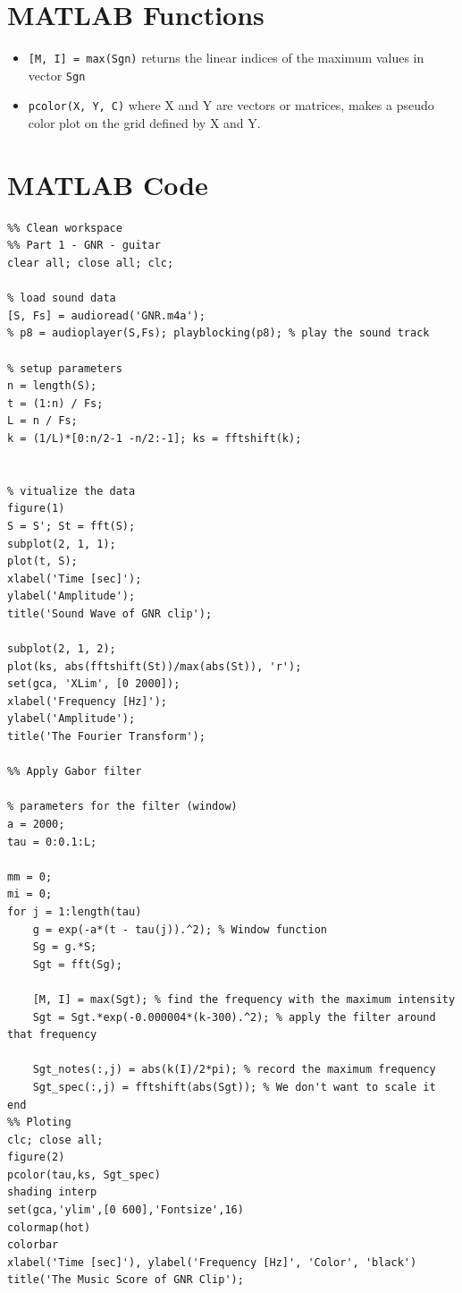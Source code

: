 \documentclass{article}
\begin{document}
\begin{appendices}

\section{MATLAB Functions}
\begin{itemize}
    \item \texttt{[M, I] = max(Sgn)} returns the linear indices of the 
    maximum values in vector \texttt{Sgn}
    \item \texttt{pcolor(X, Y, C)} where X and Y are vectors or matrices, makes a
    pseudo color plot on the grid defined by X and Y.  
\end{itemize}

\newpage
\section{MATLAB Code}

\begin{verbatim}
%% Clean workspace
%% Part 1 - GNR - guitar
clear all; close all; clc;

% load sound data
[S, Fs] = audioread('GNR.m4a');
% p8 = audioplayer(S,Fs); playblocking(p8); % play the sound track

% setup parameters
n = length(S);
t = (1:n) / Fs;
L = n / Fs;
k = (1/L)*[0:n/2-1 -n/2:-1]; ks = fftshift(k);


% vitualize the data
figure(1)
S = S'; St = fft(S);  
subplot(2, 1, 1);
plot(t, S);
xlabel('Time [sec]');
ylabel('Amplitude');
title('Sound Wave of GNR clip');

subplot(2, 1, 2);
plot(ks, abs(fftshift(St))/max(abs(St)), 'r');
set(gca, 'XLim', [0 2000]);
xlabel('Frequency [Hz]');
ylabel('Amplitude');
title('The Fourier Transform');

%% Apply Gabor filter

% parameters for the filter (window)
a = 2000;
tau = 0:0.1:L;

mm = 0;
mi = 0;
for j = 1:length(tau)   
    g = exp(-a*(t - tau(j)).^2); % Window function   
    Sg = g.*S;   
    Sgt = fft(Sg);
    
    [M, I] = max(Sgt); % find the frequency with the maximum intensity
    Sgt = Sgt.*exp(-0.000004*(k-300).^2); % apply the filter around that frequency
    
    Sgt_notes(:,j) = abs(k(I)/2*pi); % record the maximum frequency
    Sgt_spec(:,j) = fftshift(abs(Sgt)); % We don't want to scale it
end
%% Ploting
clc; close all;
figure(2)
pcolor(tau,ks, Sgt_spec)
shading interp
set(gca,'ylim',[0 600],'Fontsize',16)
colormap(hot)
colorbar
xlabel('Time [sec]'), ylabel('Frequency [Hz]', 'Color', 'black')
title('The Music Score of GNR Clip');


\end{verbatim}
\end{appendices}
\end{document}
